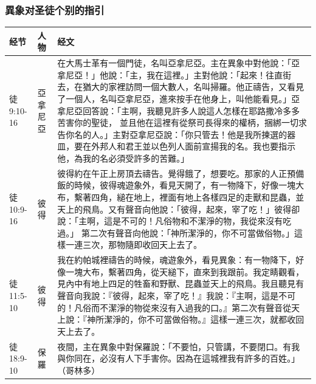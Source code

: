 \subsubsection{異象对圣徒个别的指引}
\begin{table}[H]
\centering
\begin{tabular}{p{5em}p{2.4em}p{40em}}  \toprule
经节&人物&经文 \\  \midrule
徒9:10-16&亞拿尼亞&在大馬士革有一個門徒，名叫亞拿尼亞。主在異象中對他說：「亞拿尼亞！」他說：「主，我在這裡。」主對他說：「起來！往直街去，在猶大的家裡訪問一個大數人，名叫掃羅。他正禱告，又看見了一個人，名叫亞拿尼亞，進來按手在他身上，叫他能看見。」亞拿尼亞回答說：「主啊，我聽見許多人說這人怎樣在耶路撒冷多多苦害你的聖徒， 並且他在這裡有從祭司長得來的權柄，捆綁一切求告你名的人。」主對亞拿尼亞說：「你只管去！他是我所揀選的器皿，要在外邦人和君王並以色列人面前宣揚我的名。我也要指示他，為我的名必須受許多的苦難。」\\  \midrule
徒10:9-16&彼得&彼得約在午正上房頂去禱告。覺得餓了，想要吃。那家的人正預備飯的時候，彼得魂遊象外，看見天開了，有一物降下，好像一塊大布，繫著四角，縋在地上，裡面有地上各樣四足的走獸和昆蟲，並天上的飛鳥。又有聲音向他說：「彼得，起來，宰了吃！」彼得卻說：「主啊，這是不可的！凡俗物和不潔淨的物，我從來沒有吃過。」 第二次有聲音向他說：「神所潔淨的，你不可當做俗物。」這樣一連三次，那物隨即收回天上去了。\\  \midrule
徒11:5-10&彼得&我在約帕城裡禱告的時候，魂遊象外，看見異象：有一物降下，好像一塊大布，繫著四角，從天縋下，直來到我跟前。我定睛觀看，見內中有地上四足的牲畜和野獸、昆蟲並天上的飛鳥。我且聽見有聲音向我說：『彼得，起來，宰了吃！』我說：『主啊，這是不可的！凡俗而不潔淨的物從來沒有入過我的口。』第二次有聲音從天上說：『神所潔淨的，你不可當做俗物。』這樣一連三次，就都收回天上去了。\\  \midrule
徒18:9-10&保羅&夜間，主在異象中對保羅說：「不要怕，只管講，不要閉口。有我與你同在，必沒有人下手害你。因為在這城裡我有許多的百姓。」（哥林多）\\  \midrule
\end{tabular}%
\end{table}

























